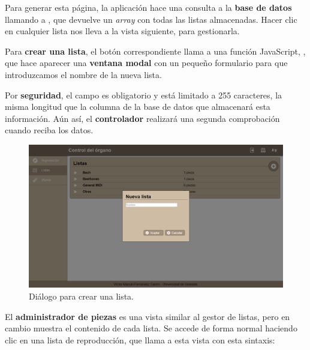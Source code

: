 \smallskip

Para generar esta página, la aplicación hace una consulta a la \textbf{base de datos} llamando a , que devuelve un \textit{array} con todas las listas almacenadas. Hacer clic en cualquier lista nos lleva a la vista siguiente, para gestionarla.

Para \textbf{crear una lista}, el botón correspondiente llama a una función JavaScript, , que hace aparecer una \textbf{ventana modal} con un pequeño formulario para que introduzcamos el nombre de la nueva lista.

Por \textbf{seguridad}, el campo es obligatorio y está limitado a 255 caracteres, la misma longitud que la columna de la base de datos que almacenará esta información. Aún así, el \textbf{controlador} realizará una segunda comprobación cuando reciba los datos.

\smallskip

\begin{figure}[H]
	\noindent \begin{centering}
		\includegraphics[width=\linewidth*3/4]{capitulo5/cap_ins_lista}
		\par\end{centering}
	\smallskip
	\caption{\label{fig:cap_ins_lista} Diálogo para crear una lista.}
\end{figure} 

\smallskip

El \textbf{administrador de piezas} es una vista similar al gestor de listas, pero en cambio muestra el contenido de cada lista. Se accede de forma normal haciendo clic en una lista de reproducción, que llama a esta vista con esta sintaxis:

\begin{center}
\end{center}

